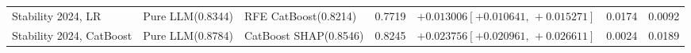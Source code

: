\documentclass[final,5p,twocolumn]{elsarticle}
\begin{document}
\begin{table}[htbp]
\begin{threeparttable}
\begin{tabular}{@{}L{24mm}L{27mm}L{24mm}rL{38mm}rr@{}}
\addlinespace
Stability 2024, LR & Pure LLM\newline (0.8344) & RFE CatBoost\newline (0.8214) & 0.7719 & $+0.013006$\newline $[+0.010641,\,+0.015271]$ & 0.0174 & 0.0092 \\
\addlinespace
Stability 2024, CatBoost & Pure LLM\newline (0.8784) & CatBoost SHAP\newline (0.8546) & 0.8245 & $+0.023756$\newline $[+0.020961,\,+0.026611]$ & 0.0024 & 0.0189 \\
\bottomrule
\end{tabular}
\end{threeparttable}
\end{table}
\end{document}
